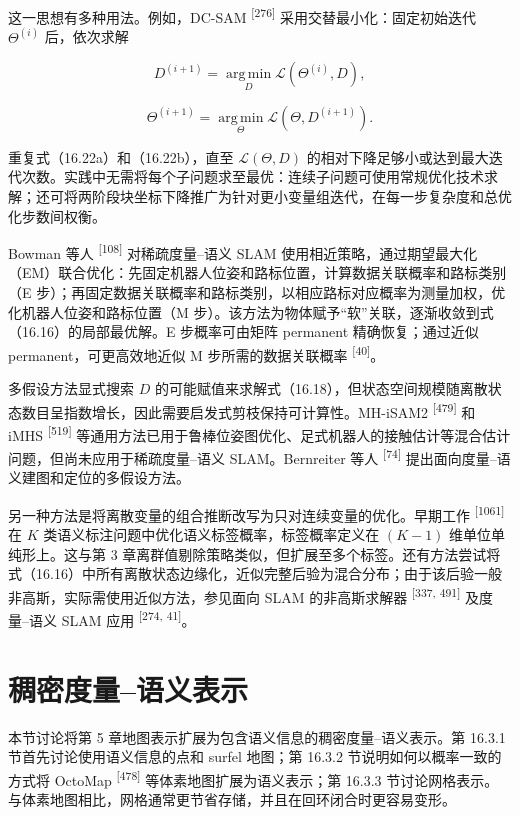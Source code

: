 这一思想有多种用法。例如，DC-SAM \textsuperscript{[276]} 采用交替最小化：固定初始迭代 $\Theta^{(i)}$ 后，依次求解

\begin{equation}
D^{(i+1)}=\operatorname*{arg\,min}_{D}\mathcal{L}(\Theta^{(i)},D),\tag{16.22a}
\end{equation}

\begin{equation}
\Theta^{(i+1)}=\operatorname*{arg\,min}_{\Theta}\mathcal{L}(\Theta,D^{(i+1)}).\tag{16.22b}
\end{equation}

重复式（16.22a）和（16.22b），直至 $\mathcal{L}(\Theta,D)$ 的相对下降足够小或达到最大迭代次数。实践中无需将每个子问题求至最优：连续子问题可使用常规优化技术求解；还可将两阶段块坐标下降推广为针对更小变量组迭代，在每一步复杂度和总优化步数间权衡。

Bowman 等人 \textsuperscript{[108]} 对稀疏度量--语义 SLAM 使用相近策略，通过期望最大化（EM）联合优化：先固定机器人位姿和路标位置，计算数据关联概率和路标类别（E 步）；再固定数据关联概率和路标类别，以相应路标对应概率为测量加权，优化机器人位姿和路标位置（M 步）。该方法为物体赋予“软”关联，逐渐收敛到式（16.16）的局部最优解。E 步概率可由矩阵 permanent 精确恢复；通过近似 permanent，可更高效地近似 M 步所需的数据关联概率 \textsuperscript{[40]}。

多假设方法显式搜索 $D$ 的可能赋值来求解式（16.18），但状态空间规模随离散状态数目呈指数增长，因此需要启发式剪枝保持可计算性。MH-iSAM2 \textsuperscript{[479]} 和 iMHS \textsuperscript{[519]} 等通用方法已用于鲁棒位姿图优化、足式机器人的接触估计等混合估计问题，但尚未应用于稀疏度量--语义 SLAM。Bernreiter 等人 \textsuperscript{[74]} 提出面向度量--语义建图和定位的多假设方法。

另一种方法是将离散变量的组合推断改写为只对连续变量的优化。早期工作 \textsuperscript{[1061]} 在 $K$ 类语义标注问题中优化语义标签概率，标签概率定义在 $(K-1)$ 维单位单纯形上。这与第 3 章离群值剔除策略类似，但扩展至多个标签。还有方法尝试将式（16.16）中所有离散状态边缘化，近似完整后验为混合分布；由于该后验一般非高斯，实际需使用近似方法，参见面向 SLAM 的非高斯求解器 \textsuperscript{[337, 491]} 及度量--语义 SLAM 应用 \textsuperscript{[274, 41]}。

\section{稠密度量--语义表示}

本节讨论将第 5 章地图表示扩展为包含语义信息的稠密度量--语义表示。第 16.3.1 节首先讨论使用语义信息的点和 surfel 地图；第 16.3.2 节说明如何以概率一致的方式将 OctoMap \textsuperscript{[478]} 等体素地图扩展为语义表示；第 16.3.3 节讨论网格表示。与体素地图相比，网格通常更节省存储，并且在回环闭合时更容易变形。

